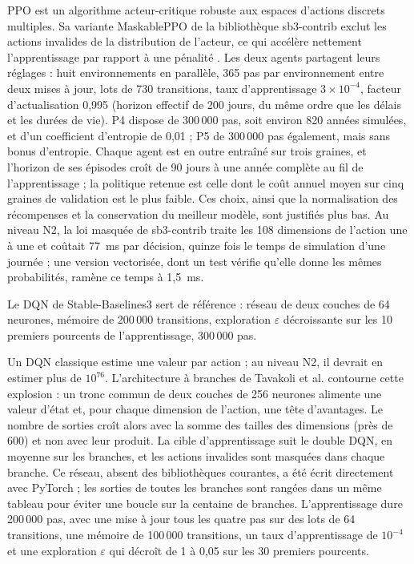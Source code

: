 PPO \cite{ppo} est un algorithme acteur-critique robuste aux espaces d'actions discrets multiples. Sa variante MaskablePPO de la bibliothèque sb3-contrib \cite{sb3} exclut les actions invalides de la distribution de l'acteur, ce qui accélère nettement l'apprentissage par rapport à une pénalité \cite{masking}. Les deux agents partagent leurs réglages : huit environnements en parallèle, 365 pas par environnement entre deux mises à jour, lots de 730 transitions, taux d'apprentissage $3\times10^{-4}$, facteur d'actualisation 0,995 (horizon effectif de 200 jours, du même ordre que les délais et les durées de vie). P4 dispose de 300\,000 pas, soit environ 820 années simulées, et d'un coefficient d'entropie de 0,01 ; P5 de 300\,000 pas également, mais sans bonus d'entropie. Chaque agent est en outre entraîné sur trois graines, et l'horizon de ses épisodes croît de 90 jours à une année complète au fil de l'apprentissage ; la politique retenue est celle dont le coût annuel moyen sur cinq graines de validation est le plus faible. Ces choix, ainsi que la normalisation des récompenses et la conservation du meilleur modèle, sont justifiés plus bas. Au niveau N2, la loi masquée de sb3-contrib traite les 108 dimensions de l'action une à une et coûtait 77~ms par décision, quinze fois le temps de simulation d'une journée ; une version vectorisée, dont un test vérifie qu'elle donne les mêmes probabilités, ramène ce temps à 1,5~ms.

Le DQN \cite{dqn} de Stable-Baselines3 sert de référence : réseau de deux couches de 64 neurones, mémoire de 200\,000 transitions, exploration $\varepsilon$ décroissante sur les 10 premiers pourcents de l'apprentissage, 300\,000 pas.

Un DQN classique estime une valeur par action ; au niveau N2, il devrait en estimer plus de $10^{76}$. L'architecture à branches de Tavakoli et al. \cite{bdq} contourne cette explosion : un tronc commun de deux couches de 256 neurones alimente une valeur d'état et, pour chaque dimension de l'action, une tête d'avantages. Le nombre de sorties croît alors avec la somme des tailles des dimensions (près de 600) et non avec leur produit. La cible d'apprentissage suit le double DQN, en moyenne sur les branches, et les actions invalides sont masquées dans chaque branche. Ce réseau, absent des bibliothèques courantes, a été écrit directement avec PyTorch ; les sorties de toutes les branches sont rangées dans un même tableau pour éviter une boucle sur la centaine de branches. L'apprentissage dure 200\,000 pas, avec une mise à jour tous les quatre pas sur des lots de 64 transitions, une mémoire de 100\,000 transitions, un taux d'apprentissage de $10^{-4}$ et une exploration $\varepsilon$ qui décroît de 1 à 0,05 sur les 30 premiers pourcents.

